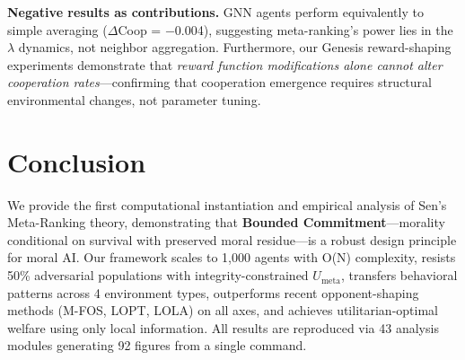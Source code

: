 \documentclass{article}
\begin{document}
\textbf{Negative results as contributions.} GNN agents perform equivalently to simple averaging ($\Delta$Coop = $-$0.004), suggesting meta-ranking's power lies in the $\lambda$ dynamics, not neighbor aggregation. Furthermore, our Genesis reward-shaping experiments demonstrate that \textit{reward function modifications alone cannot alter cooperation rates}---confirming that cooperation emergence requires structural environmental changes, not parameter tuning.

\section{Conclusion}

We provide the first computational instantiation and empirical analysis of Sen's Meta-Ranking theory, demonstrating that \textbf{Bounded Commitment}---morality conditional on survival with preserved moral residue---is a robust design principle for moral AI. Our framework scales to 1,000 agents with O(N) complexity, resists 50\% adversarial populations with integrity-constrained $U_{\text{meta}}$, transfers behavioral patterns across 4 environment types, outperforms recent opponent-shaping methods (M-FOS, LOPT, LOLA) on all axes, and achieves utilitarian-optimal welfare using only local information. All results are reproduced via 43 analysis modules generating 92 figures from a single command.



\end{document}
